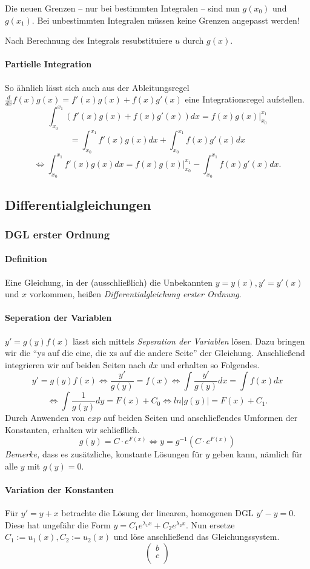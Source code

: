\documentclass[a4paper, 9pt, DIV=24]{scrartcl}
\begin{document}
Die neuen Grenzen -- nur bei bestimmten Integralen -- sind nun $g(x_0)$ und $g(x_1)$.
Bei unbestimmten Integralen müssen keine Grenzen angepasst werden!

Nach Berechnung des Integrals resubstituiere $u$ durch $g(x)$.

\paragraph{Partielle Integration}
So ähnlich lässt sich auch aus der Ableitungsregel $\frac{d}{dx}f(x)g(x) = f'(x)g(x) + f(x)g'(x)$ eine Integrationsregel aufstellen.
\[ \int_{x_0}^{x_1}(f'(x)g(x)+f(x)g'(x))dx = f(x)g(x)|_{x_0}^{x_1} \]
\[ = \int_{x_0}^{x_1}f'(x)g(x)dx + \int_{x_0}^{x_1}f(x)g'(x)dx \]
\[ \iff \int_{x_0}^{x_1}f'(x)g(x)dx = f(x)g(x)|_{x_0}^{x_1} - \int_{x_0}^{x_1}f(x)g'(x)dx. \]

\subsection{Differentialgleichungen}

\subsubsection{DGL erster Ordnung}
\paragraph{Definition}
Eine Gleichung, in der (ausschließlich) die Unbekannten $y = y(x), y' = y'(x)$ und $x$ vorkommen, heißen \emph{Differentialgleichung erster Ordnung}.
\paragraph{Seperation der Variablen}
$y' = g(y)f(x)$ lässt sich mittels \emph{Seperation der Variablen} lösen.
Dazu bringen wir die ``ys auf die eine, die xs auf die andere Seite'' der Gleichung.
Anschließend integrieren wir auf beiden Seiten nach $dx$ und erhalten so Folgendes.
\[ y' = g(y)f(x) \iff \frac{y'}{g(y)} = f(x) \iff \int\frac{y'}{g(y)}dx = \int f(x)dx \]
\[ \iff \int\frac{1}{g(y)}dy = F(x) + C_0 \iff ln |g(y)| = F(x) + C_1. \]
Durch Anwenden von $exp$ auf beiden Seiten und anschließendes Umformen der Konstanten, erhalten wir schließlich.
\[ g(y) = C\cdot e^{F(x)} \iff y = g^{-1}(C\cdot e^{F(x)}) \]
\emph{Bemerke,} dass es zusätzliche, konstante Lösungen für $y$ geben kann, nämlich für alle $y$ mit $g(y) = 0$.

\paragraph{Variation der Konstanten}
Für $y' = y + x$ betrachte die Lösung der linearen, homogenen DGL $y' - y = 0$. Diese hat ungefähr die Form $y = C_1 e^{\lambda_1 x} + C_2 e^{\lambda_2 x}$.
Nun ersetze $C_1 := u_1(x), C_2 := u_2(x)$ und löse anschließend das Gleichungssystem.
\[
\begin{pmatrix}
 b \\ c \\
\end{pmatrix}
\]
\end{document}
